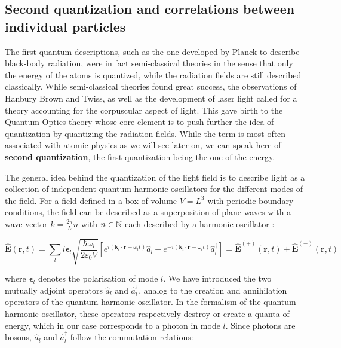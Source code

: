 \subsection{Second quantization and correlations between individual particles}

The first quantum descriptions, such as the one developed by Planck to describe black-body radiation, were in fact semi-classical theories in the sense that only the energy of the atoms is quantized, while the radiation fields are still described classically. While semi-classical theories found great success, the observations of Hanbury Brown and Twiss, as well as the development of laser light called for a theory accounting for the corpuscular aspect of light. This gave birth to the Quantum Optics theory whose core element is to push further the idea of quantization by quantizing the radiation fields. While the term is most often associated with atomic physics as we will see later on, we can speak here of \textbf{second quantization}, the first quantization being the one of the energy.

The general idea behind the quantization of the light field is to describe light as a collection of independent quantum harmonic oscillators for the different modes of the field. For a field defined in a box of volume $V=L^3$ with periodic boundary conditions, the field can be described as a superposition of plane waves with a wave vector $k=\frac{2 \pi}{L} n$ with $n \in \mathbb{N}$ each described by a harmonic oscillator \cite{walls2008}:

\begin{equation}
    \hat{\bm{E}}(\bm{r}, t)=\sum_{l} i \bm{\epsilon}_{l} \sqrt{\frac{\hbar \omega_l}{2 \varepsilon_0 V}} \left[e^{i (\bm{k}_{l} \cdot \bm{r} - \omega_l t)} \hat{a}_{l}-e^{-i (\bm{k}_{l} \cdot \bm{r} - \omega_l t)} \hat{a}_{l}^{\dagger}\right]  = \hat{\bm{E}}^{(+)}(\bm{r}, t)+\hat{\bm{E}}^{(-)}(\bm{r}, t)
\end{equation}

\noindent where $\bm{\epsilon}_{l}$ denotes the polarisation of mode $l$. We have introduced the two mutually adjoint operators $\hat{a}_{l}$ and $\hat{a}_{l}^{\dagger}$, analog to the creation and annihilation operators of the quantum harmonic oscillator. In the formalism of the quantum harmonic oscillator, these operators respectively destroy or create a quanta of energy, which in our case corresponds to a photon in mode $l$. Since photons are bosons, $\hat{a}_{l}$ and $\hat{a}_{l}^{\dagger}$ follow the commutation relations:

